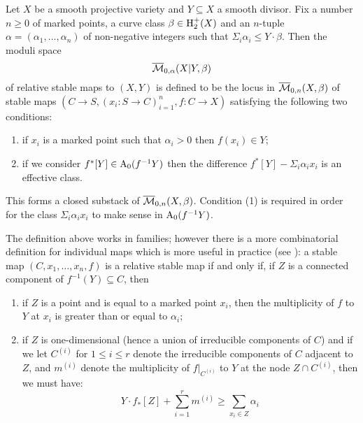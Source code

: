 \begin{definition}[{\cite[Definition 1.1]{Ga}}] Let $X$ be a smooth projective variety and $Y \subseteq X$ a smooth divisor. Fix a number $n \geq 0$ of marked points, a curve class $\beta \in \operatorname{H}_2^+(X)$ and an $n$-tuple $\alpha = (\alpha_1, \ldots, \alpha_n)$ of non-negative integers such that $\Sigma_i \alpha_i \leq Y \cdot \beta$. Then the moduli space
\begin{equation*} \overline{\mathcal M}_{0,\alpha}(X|Y,\beta) \end{equation*}
of relative stable maps to $(X,Y)$ is defined to be the locus in $\overline{\mathcal M}_{0,n}(X,\beta)$ of stable maps $(C \to S , (x_i : S \to C)_{i=1}^n , f : C \to X)$ satisfying the following two conditions:
\begin{enumerate}
\item if $x_i$ is a marked point such that $\alpha_i > 0$ then $f(x_i) \in Y$;
\item if we consider $f^* [Y] \in \operatorname{A}_0(f^{-1}Y)$ then the difference $f^* [Y] - \Sigma_i \alpha_i x_i$ is an effective class.
\end{enumerate}
This forms a closed substack of $\overline{\mathcal M}_{0,n}(X,\beta)$. Condition (1) is required in order for the class $\Sigma_i \alpha_i x_i$ to make sense in $\operatorname{A}_0(f^{-1}Y)$.
\end{definition}

\begin{remark} The definition above works in families; however there is a more combinatorial definition for individual maps which is more useful in practice (see \cite[Remark 1.4]{Ga}): a stable map $(C,x_1, \ldots, x_n,f)$ is a relative stable map if and only if, if $Z$ is a connected component of $f^{-1}(Y) \subseteq C$, then
\begin{enumerate}
\item if $Z$ is a point and is equal to a marked point $x_i$, then the multiplicity of $f$ to $Y$ at $x_i$ is greater than or equal to $\alpha_i$;
\item if $Z$ is one-dimensional (hence a union of irreducible components of $C$) and if we let $C^{(i)}$ for $1 \leq i \leq r$ denote the irreducible components of $C$ adjacent to $Z$, and $m^{(i)}$ denote the multiplicity of $f|_{C^{(i)}}$ to $Y$ at the node $Z \cap C^{(i)}$, then we must have:
\begin{equation} \label{Inequality relative stable maps} Y \cdot f_* [Z] + \sum_{i=1}^r m^{(i)} \geq \sum_{x_i \in Z} \alpha_i \end{equation}
\end{enumerate} \end{remark}

